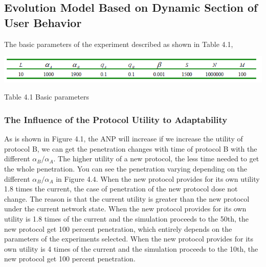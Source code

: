 \documentclass{article}
\begin{document}
\subsection{Evolution Model Based on Dynamic Section of User Behavior}
The basic parameters of the experiment described as shown in Table 4.1,
\par
\centerline{\includegraphics[width=.7\textwidth]{Table4.png}}
\centerline{Table 4.1 Basic parameters}

\subsubsection{The Influence of the Protocol Utility to Adaptability}
As is shown in Figure 4.1, the ANP will increase if we increase the utility of protocol B, we can get the penetration
changes with time of protocol B with the different $\alpha_{B}/\alpha_{A}$. The higher utility of a new protocol, the
less time needed to get the whole penetration. You can see the penetration varying depending on the different
$\alpha_{B}/\alpha_{A}$ in Figure 4.4. When the new protocol provides for its own utility 1.8 times the current, the
case of penetration of the new protocol dose not change. The reason is that the current utility is greater than the
new protocol under the current network state. When the new protocol provides for its own utility is 1.8 times of the
current and the simulation proceeds to the 50th,  the new protocol get 100 percent penetration, which entirely depends
on the parameters of the experiments selected. When the new protocol provides for its own utility is 4 times of the
current and the simulation proceeds to the 10th, the new protocol get 100 percent penetration.
\end{document}
